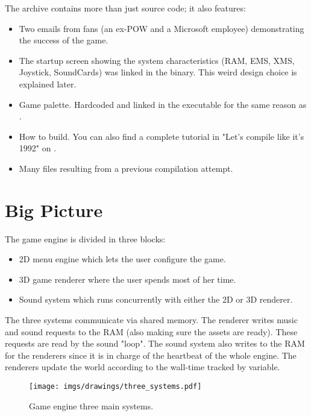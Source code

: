 \documentclass[book.tex]{subfiles}
\begin{document}
The archive contains more than just source code; it also features:
\begin{itemize}
\item {} Two emails from fans (an ex-POW and a Microsoft employee) demonstrating the success of the game.
\item {} The startup screen showing the system characteristics (RAM, EMS, XMS, Joystick, SoundCards) was linked in the binary. This weird design choice is explained later.
\item {} Game palette. Hardcoded and linked in the executable for the same reason as .
\item {} How to build. You can also find a complete tutorial in "Let's compile like it's 1992" on .
\item Many files resulting from a previous compilation attempt.
\end{itemize}







\section{Big Picture}
The game engine is divided in three blocks:
\begin{itemize}
\item 2D menu engine which lets the user configure the game.
\item 3D game renderer where the user spends most of her time.
\item Sound system which runs concurrently with either the 2D or 3D renderer. 
\end{itemize}
The three systems communicate via shared memory. The renderer writes music and sound requests to the RAM (also making sure the assets are ready). These requests are read by the sound "loop". The sound system also writes to the RAM for the renderers since it is in charge of the heartbeat of the whole engine. The renderers update the world according to the wall-time tracked by  variable.
\par
\begin{figure}[H]
\centering
 \texttt{[image: imgs/drawings/three\_systems.pdf]}
 \caption{Game engine three main systems.}
 \end{figure}
 \par
\end{document}
